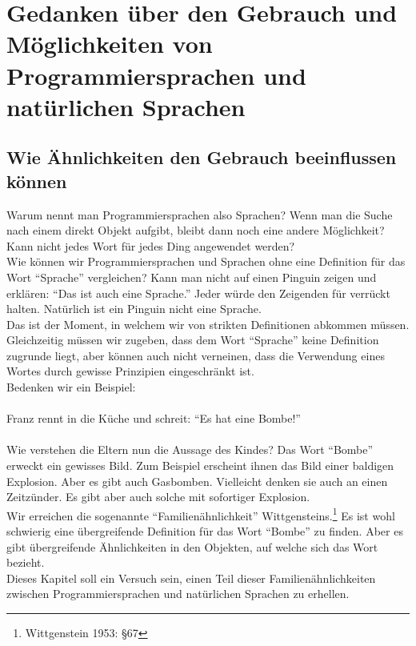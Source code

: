 \documentclass[10pt,a4paper]{article}
\begin{document}
\section{Gedanken über den Gebrauch und Möglichkeiten von Programmiersprachen und natürlichen Sprachen}

\subsection{Wie Ähnlichkeiten den Gebrauch beeinflussen können}
Warum nennt man Programmiersprachen also Sprachen? Wenn man die Suche nach einem direkt Objekt aufgibt, bleibt dann noch eine andere Möglichkeit? Kann nicht jedes Wort für jedes Ding angewendet werden? \\
Wie können wir Programmiersprachen und Sprachen ohne eine Definition für das Wort \enquote{Sprache} vergleichen? Kann man nicht auf einen Pinguin zeigen und erklären: \enquote{Das ist auch eine Sprache.} Jeder würde den Zeigenden für verrückt halten. Natürlich ist ein Pinguin nicht eine Sprache. \\
Das ist der Moment, in welchem wir von strikten Definitionen abkommen müssen. Gleichzeitig müssen wir zugeben, dass dem Wort \enquote{Sprache} keine Definition zugrunde liegt, aber können auch nicht verneinen, dass die Verwendung eines Wortes durch gewisse Prinzipien eingeschränkt ist. \\
Bedenken wir ein Beispiel: \\
\\
Franz rennt in die Küche und schreit: \enquote{Es hat eine Bombe!} \\
\\
Wie verstehen die Eltern nun die Aussage des Kindes? Das Wort \enquote{Bombe} erweckt ein gewisses Bild. Zum Beispiel erscheint ihnen das Bild einer baldigen Explosion. Aber es gibt auch Gasbomben. Vielleicht denken sie auch an einen Zeitzünder. Es gibt aber auch solche mit sofortiger Explosion. \\
Wir erreichen die sogenannte \enquote{Familienähnlichkeit} Wittgensteins.\footnote{Wittgenstein 1953: §67} Es ist wohl schwierig eine übergreifende Definition für das Wort \enquote{Bombe} zu finden. Aber es gibt übergreifende Ähnlichkeiten in den Objekten, auf welche sich das Wort bezieht. \\
Dieses Kapitel soll ein Versuch sein, einen Teil dieser Familienähnlichkeiten zwischen Programmiersprachen und natürlichen Sprachen zu erhellen.
\end{document}
